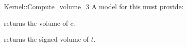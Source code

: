 \begin{ccRefFunctionObjectConcept}{Kernel::Compute_volume_3}
A model for this must provide:


       {returns the volume of $c$. }

       {returns the signed volume of $t$. }

\end{ccRefFunctionObjectConcept}
